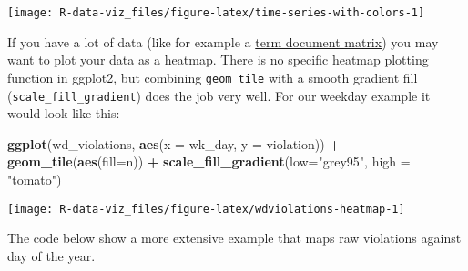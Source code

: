 \documentclass[]{book}
\newenvironment{Shaded}{\begin{snugshade}}{\end{snugshade}}
\newcommand{\CommentTok}[1]{\textcolor[rgb]{0.56,0.35,0.01}{\textit{#1}}}
\newcommand{\DataTypeTok}[1]{\textcolor[rgb]{0.13,0.29,0.53}{#1}}
\newcommand{\KeywordTok}[1]{\textcolor[rgb]{0.13,0.29,0.53}{\textbf{#1}}}
\newcommand{\NormalTok}[1]{#1}
\newcommand{\OperatorTok}[1]{\textcolor[rgb]{0.81,0.36,0.00}{\textbf{#1}}}
\newcommand{\StringTok}[1]{\textcolor[rgb]{0.31,0.60,0.02}{#1}}
\begin{document}
\texttt{[image: R-data-viz\_files/figure-latex/time-series-with-colors-1]}

If you have a lot of data (like for example a \href{https://en.wikipedia.org/wiki/Document-term_matrix}{term document matrix}) you may want to plot your data as a heatmap. There is no specific heatmap plotting function in ggplot2, but combining \texttt{geom\_tile} with a smooth gradient fill (\texttt{scale\_fill\_gradient}) does the job very well. For our weekday example it would look like this:

\begin{Shaded}
\begin{Highlighting}[]
\KeywordTok{ggplot}\NormalTok{(wd_violations, }\KeywordTok{aes}\NormalTok{(}\DataTypeTok{x =}\NormalTok{ wk_day, }\DataTypeTok{y =}\NormalTok{ violation)) }\OperatorTok{+}
\StringTok{     }\KeywordTok{geom_tile}\NormalTok{(}\KeywordTok{aes}\NormalTok{(}\DataTypeTok{fill=}\NormalTok{n)) }\OperatorTok{+}
\StringTok{     }\KeywordTok{scale_fill_gradient}\NormalTok{(}\DataTypeTok{low=}\StringTok{"grey95"}\NormalTok{, }\DataTypeTok{high =} \StringTok{"tomato"}\NormalTok{)}
\end{Highlighting}
\end{Shaded}

\texttt{[image: R-data-viz\_files/figure-latex/wdviolations-heatmap-1]}

The code below show a more extensive example that maps raw violations against day of the year.

\begin{Shaded}
\end{Shaded}
\end{document}
